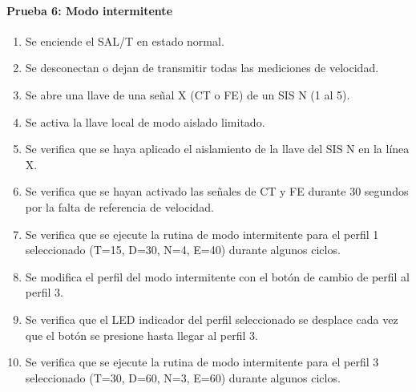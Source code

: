 \paragraph{Prueba 6: Modo intermitente}
\begin{enumerate}
\item	Se enciende el SAL/T en estado normal.
\item	Se desconectan o dejan de transmitir todas las mediciones de velocidad.
\item	Se abre una llave de una señal X (CT o FE) de un SIS N (1 al 5).
\item	Se activa la llave local de modo aislado limitado.
\item	Se verifica que se haya aplicado el aislamiento de la llave del SIS N en la línea X.
\item	Se verifica que se hayan activado las señales de CT y FE  durante 30 segundos por la falta de referencia de velocidad.
\item	Se verifica que se ejecute la rutina de modo intermitente para el perfil 1 seleccionado (T=15, D=30, N=4, E=40) durante algunos ciclos.
\item	Se modifica el perfil del modo intermitente con el botón de cambio de perfil al perfil 3.
\item	Se verifica que el LED indicador del perfil seleccionado se desplace cada vez que el botón se presione hasta llegar al perfil 3.
\item	Se verifica que se ejecute la rutina de modo intermitente para el perfil 3 seleccionado (T=30, D=60, N=3, E=60) durante algunos ciclos.

\end{enumerate}

